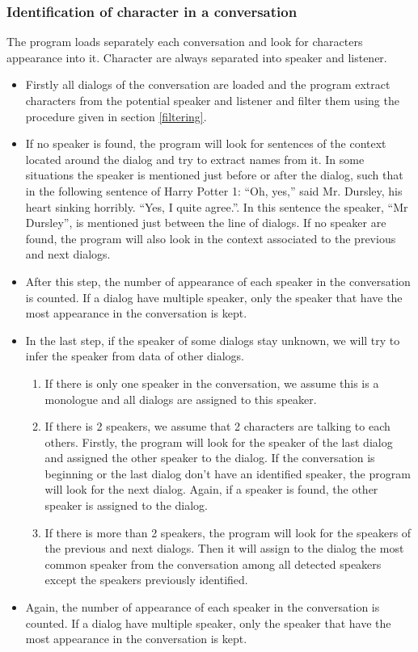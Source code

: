 \documentclass[a4paper, 12pt]{report}
\begin{document}
\subsubsection{Identification of character in a conversation}
The program loads separately each conversation and look for characters appearance into it. Character are always separated into speaker and listener. \\
\begin{itemize}
\item Firstly all dialogs of the conversation are loaded and the program extract characters from the potential speaker and listener and filter them using the procedure given in section \ref{filtering}. 

\item If no speaker is found, the program will look for sentences of the context located around the dialog and try to extract names from it. In some situations the speaker is mentioned just before or after the dialog, such that in the following sentence of Harry Potter 1: “Oh, yes,” said Mr. Dursley, his heart sinking horribly. “Yes, I quite agree.”. In this sentence the speaker, ``Mr Dursley'', is mentioned just between the line of dialogs. If no speaker are found, the program will also look in the context associated to the previous and next dialogs.\\

\item After this step, the number of appearance of each speaker in the conversation is counted. If a dialog have multiple speaker, only the speaker that have the most appearance in the conversation is kept.

\item In the last step, if the speaker of some dialogs stay unknown, we will try to infer the speaker from data of other dialogs.
	\begin{enumerate}
	\item If there is only one speaker in the conversation, we assume this is a monologue and all dialogs are assigned to this speaker.
	\item If there is 2 speakers, we assume that 2 characters are talking to each others. Firstly, the program will look for the speaker of the last dialog and assigned the other speaker to the dialog. If the conversation is beginning or the last dialog don't have an identified speaker, the program will look for the next dialog. Again, if a speaker is found, the other speaker is assigned to the dialog.
	\item If there is more than 2 speakers, the program will look for the speakers of the previous and next dialogs. Then it will assign to the dialog the most common speaker from the conversation among all detected speakers except the speakers previously identified.
	\end{enumerate}
\item Again, the number of appearance of each speaker in the conversation is counted. If a dialog have multiple speaker, only the speaker that have the most appearance in the conversation is kept.


\end{itemize}
\end{document}
